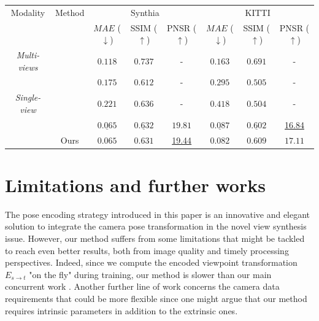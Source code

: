 \begin{table}[htp!]
\begin{center}
\begin{adjustbox}{max width=\textwidth}
\begin{tabular}[h]{c||ccccccc}
\hline
Modality &Method & \multicolumn{3}{c}{Synthia} & \multicolumn{3}{c}{KITTI} \\
& & $MAE$ ($\downarrow$) & SSIM ($\uparrow$)& PNSR ($\uparrow$) & $MAE$ ($\downarrow$) & SSIM ($\uparrow$) & PNSR ($\uparrow$)\\
\hline
\textit{Multi-views}&\citep{sun2018multiview} & $0.118$ & $0.737$ & - &  $0.163$ & $0.691$ & - \\
\hline
&\citep{tatarchenko2015single} & $0.175$ & $0.612$ & - &  $0.295$ & $0.505$ &  - \\
\textit{Single-view} & \citep{zhou2016view} & $0.221$ & $\mathbf{0.636}$ & -  & $0.418$ & $0.504$ & - \\
 & \citep{kim2020novel}  & $\underline{0.065}$ & $\underline{0.632}$ & $\mathbf{19.81}$ & $\underline{0.087}$ & $\underline{0.602}$ & \underline{16.84} \\
& Ours & $\mathbf{0.065}$ & $0.631$ & \underline{19.44} & $\mathbf{0.082}$ & $\mathbf{0.609}$ & $\mathbf{17.11}$ \\
\hline\hline
\end{tabular}
\end{adjustbox}
\end{center}
\label{tab:2}
\end{table}


\section{Limitations and further works}
The pose encoding strategy introduced in this paper is an innovative and elegant solution to integrate the camera pose transformation in the novel view synthesis issue. However, our method suffers from some limitations that might be tackled to reach even better results, both from image quality and timely processing perspectives. Indeed, since we compute the encoded viewpoint transformation $E_{s\xrightarrow{}t}$ "on the fly" during training, our method is slower than our main concurrent work \citep{kim2020novel}. Another further line of work concerns the camera data requirements that could be more flexible since one might argue that our method requires intrinsic parameters in addition to the extrinsic ones. 

